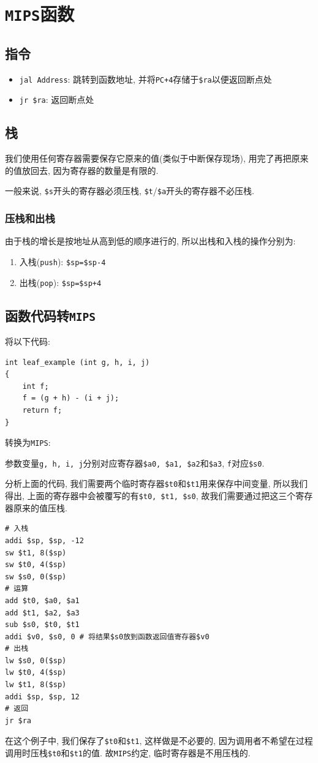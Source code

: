 \section{\texttt{MIPS}函数}
\subsection{指令}
\begin{itemize}
\item \verb|jal Address|: 跳转到函数地址, 并将\verb|PC+4|存储于\verb|$ra|以便返回断点处
\item \verb|jr $ra|: 返回断点处
\end{itemize}
\subsection{栈}
我们使用任何寄存器需要保存它原来的值(类似于中断保存现场), 用完了再把原来的值放回去, 因为寄存器的数量是有限的. \par 
一般来说, \verb|$s|开头的寄存器必须压栈, \verb|$t|/\verb|$a|开头的寄存器不必压栈.
\subsubsection{压栈和出栈}
由于栈的增长是按地址从高到低的顺序进行的, 所以出栈和入栈的操作分别为:
\begin{enumerate}
\item 入栈(\verb|push|): \verb|$sp=$sp-4|
\item 出栈(\verb|pop|): \verb|$sp=$sp+4|
\end{enumerate}
\subsection{函数代码转\texttt{MIPS}}
将以下代码:
\begin{lstlisting}
int leaf_example (int g, h, i, j)
{
    int f;
    f = (g + h) - (i + j);
    return f;
}
\end{lstlisting}\par
转换为\texttt{MIPS}:\par
参数变量\verb|g, h, i, j|分别对应寄存器\verb|$a0, $a1, $a2|和\verb|$a3|, \verb|f|对应\verb|$s0|.\par  分析上面的代码, 我们需要两个临时寄存器\verb|$t0|和\verb|$t1|用来保存中间变量, 所以我们得出, 上面的寄存器中会被覆写的有\verb|$t0, $t1, $s0|, 故我们需要通过把这三个寄存器原来的值压栈.
\begin{lstlisting}
# 入栈
addi $sp, $sp, -12
sw $t1, 8($sp)
sw $t0, 4($sp)
sw $s0, 0($sp)
# 运算
add $t0, $a0, $a1
add $t1, $a2, $a3
sub $s0, $t0, $t1
addi $v0, $s0, 0 # 将结果$s0放到函数返回值寄存器$v0
# 出栈
lw $s0, 0($sp)
lw $t0, 4($sp)
lw $t1, 8($sp)
addi $sp, $sp, 12
# 返回
jr $ra
\end{lstlisting}
在这个例子中, 我们保存了\verb|$t0|和\verb|$t1|, 这样做是不必要的, 因为调用者不希望在过程调用时压栈\verb|$t0|和\verb|$t1|的值. 故\verb|MIPS|约定, 临时寄存器是不用压栈的.

